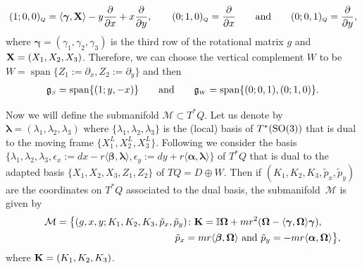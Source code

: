 \documentclass[pdftex]{sigma}
\numberwithin{equation}{section}
\def\M{\mathcal{M}}
\def\g{\mathfrak{g}}
\def\subSS{{\mbox{\tiny{$S$}}}}
\def\subWW{{\mbox{\tiny{$W$}}}}
\def\subQQ{{\mbox{\tiny{$Q$}}}}
\def\vecOm{\boldsymbol{\Omega}}
\newcommand{\SO}{{\rm SO}}
\def\vecL{\boldsymbol{\lambda}}
\def\vecgamma{\boldsymbol{\gamma}}
\def\vecalpha{\boldsymbol{\alpha}}
\def\vecbeta{\boldsymbol{\beta}}
\begin{document}
\begin{gather*}
(1;0,0)_\subQQ = \langle \vecgamma, {\bf X} \rangle -y\frac{\partial}{\partial x} + x\frac{\partial}{\partial y}, \qquad (0;1,0)_\subQQ = \frac{\partial}{\partial x} \qquad \mbox{and} \qquad (0;0,1)_\subQQ = \frac{\partial}{\partial y},
\end{gather*}
where $\vecgamma = (\gamma_1, \gamma_2, \gamma_3)$ is the third row of the rotational matrix $g$ and ${\bf X} = (X_1,X_2, X_3)$.
Therefore, we can choose the vertical complement $W$ to be $W=\operatorname{span}\{Z_1:=\partial_x, Z_2:= \partial_y\}$ and then
\begin{gather*}
\g_\subSS = \operatorname{span}\{(1;y,-x)\} \qquad \mbox{and} \qquad \g_\subWW =\operatorname{span}\{(0;0,1), (0;1,0) \}.
\end{gather*}

Now we will def\/ine the submanifold $\M\subset T^*Q$. Let us denote by $\vecL = (\lambda_1, \lambda_2, \lambda_3)$ where $\{\lambda_1, \lambda_2, \lambda_3\}$ is the (local) basis of $T^*(\SO(3))$ that is dual to the moving frame $\{X_1^L, X_2^L, X_3^L\}$.  Following \cite{Paula, Luis} we consider the basis $\{\lambda_1, \lambda_2, \lambda_3, \epsilon_x := dx - r \langle \vecbeta,\vecL \rangle , \epsilon_y := dy + r \langle \vecalpha,\vecL \rangle \}$ of $T^*Q$ that is dual to the adapted basis $\{X_1, X_2, X_3 ,Z_1, Z_2\}$ of $TQ = D\oplus W$. Then if $(K_1, K_2, K_3, \tilde p_x, \tilde p_y)$ are the coordinates on $T^*Q$ associated to the dual basis, the submanifold~$\M$ is given by
\begin{gather*}
\M = \big\{ (g,x,y; K_1, K_2, K_3, \tilde p_x, \tilde p_y) \colon {\bf K} = \mathbb{I}\vecOm + mr^2 (\vecOm - \langle \vecgamma, \vecOm \rangle \vecgamma ), \\
\hphantom{\M = \big\{ (g,x,y; K_1, K_2, K_3, \tilde p_x, \tilde p_y) \colon}{} \tilde p_x = mr \langle \vecbeta,\vecOm\rangle \  \mbox{and} \  \tilde p_y = - mr \langle \vecalpha, \vecOm\rangle  \big\} ,
\end{gather*}
where ${\bf K} = ( K_1, K_2, K_3)$.
\end{document}
